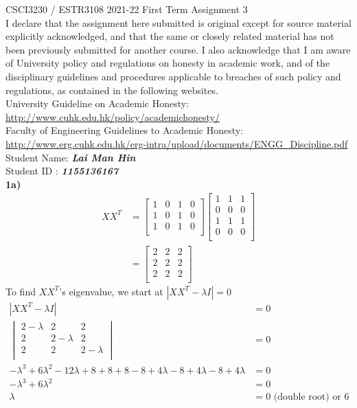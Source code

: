 \documentclass[12pt]{article}
\begin{document}
\thispagestyle{firstpage}
CSCI3230 / ESTR3108 2021-22 First Term Assignment 3\\
I declare that the assignment here submitted is original except for source material explicitly acknowledged, and that the same or closely related material has not been previously submitted for another course. I also acknowledge that I am aware of University policy and regulations on honesty in academic work, and
of the disciplinary guidelines and procedures applicable to breaches of such policy and regulations, as contained in the following websites.\\
University Guideline on Academic Honesty:\\
\url{http://www.cuhk.edu.hk/policy/academichonesty/}\\
Faculty of Engineering Guidelines to Academic Honesty:\\
\url{http://www.erg.cuhk.edu.hk/erg-intra/upload/documents/ENGG_Discipline.pdf}\\
Student Name: \textit{\textbf{Lai Man Hin}}\\
Student ID : \textit{\textbf{1155136167}}\\
\textbf{1a)}\\
\begin{align*}
XX^{T} &= \begin{bmatrix}
1 & 0 & 1 & 0\\
1 & 0 & 1 & 0\\
1 & 0 & 1 & 0\\
\end{bmatrix}
\begin{bmatrix}
1 & 1 & 1\\
0 & 0 & 0\\
1 & 1 & 1\\
0 & 0 & 0\\
\end{bmatrix}
\\&= \begin{bmatrix}
2 & 2 & 2\\
2 & 2 & 2\\
2 & 2 & 2\\
\end{bmatrix}
\end{align*}
To find $XX^{T}$'s eigenvalue, we start at $|XX^{T} - \lambda I| = 0$\\
\begin{align*}
|XX^{T} - \lambda I| &= 0\\
\begin{vmatrix}
2-\lambda & 2 & 2\\
2 & 2-\lambda & 2\\
2 & 2 & 2-\lambda\\
\end{vmatrix} &= 0\\
-\lambda^{3} + 6\lambda^{2} - 12\lambda + 8 + 8 + 8 - 8 + 4\lambda - 8 + 4\lambda - 8 + 4\lambda &= 0\\
-\lambda^{3} + 6\lambda^{2} &= 0\\
\lambda &= 0 \text{ (double root) or } 6\\ 
\end{align*}
\end{document}

